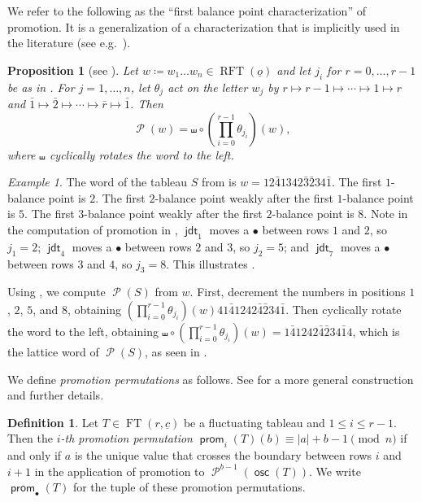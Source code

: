 \documentclass{amsart}
\newtheorem{proposition}[theorem]{Proposition}
\theoremstyle{definition}
\newtheorem{definition}[theorem]{Definition}
\theoremstyle{remark}
\newtheorem{example}[theorem]{Example}
\numberwithin{equation}{section}
\DeclareMathOperator{\osc}{\mathsf{osc}}
\DeclareMathOperator{\ft}{FT}
\DeclareMathOperator{\rft}{RFT}
\DeclareMathOperator{\prom}{\mathsf{prom}}
\DeclareMathOperator{\promotion}{\mathcal{P}}
\DeclareMathOperator{\JDT}{\mathsf{jdt}}
\begin{document}
We refer to the following as the ``first balance point characterization'' of promotion. It is a  generalization of a characterization that is implicitly used in the literature (see e.g.~\cite{Patrias,Petersen-Pylyavskyy-Rhoades,Tymoczko2012}).

\begin{proposition}[see {\cite[Prop.~8.22]{fluctuating-paper}}]
\label{prop:promotion-from-balance-points}
Let $w \coloneqq w_1 \ldots w_{n} \in \rft(\underline{o})$ and let $j_i$ for $r=0,\ldots, r-1$ be as in . For $j=1,\ldots,n$, let $\theta_j$ act on the letter $w_j$ by $r \mapsto r-1 \mapsto \cdots \mapsto 1 \mapsto r$ and $\bar{1} \mapsto \bar{2} \mapsto \cdots \mapsto \bar{r} \mapsto \bar{1}$. Then
\[
\promotion(w)=\shuffle \circ \left(\prod_{i=0}^{r-1} \theta_{j_i} \right)(w),
\]
where $\shuffle$ cyclically rotates the word to the left.
\end{proposition}


\begin{example}
\label{ex:balance_point}
The word of the tableau $S$ from  is $w=12\bar{4}1342\bar{3}\bar{2}34\bar{1}$.
The first $1$-balance point is $2$. The first $2$-balance point weakly after the first $1$-balance point is $5$.  The first $3$-balance point weakly after the first $2$-balance point is $8$. Note in the computation of promotion in , $\JDT_1$ moves a $\bullet$ between rows $1$ and $2$, so $j_1=2$; $\JDT_4$ moves a $\bullet$ between rows $2$ and $3$, so $j_2=5$; and $\JDT_7$ moves a $\bullet$ between rows $3$ and $4$, so $j_3=8$. This illustrates . 

Using , we compute $\promotion(S)$ from $w$. First, decrement the numbers in positions $1$, $2$, $5$, and $8$, obtaining $\left(\prod_{i=0}^{r-1} \theta_{j_i} \right)(w)41\bar{4}1242\bar{4}\bar{2}34\bar{1}$. 
Then cyclically rotate the word to the left, obtaining $\shuffle\circ\left( \prod_{i=0}^{r-1} \theta_{j_i} \right)(w)=1\bar{4}1242\bar{4}\bar{2}34\bar{1}4$, which is the lattice word of $\promotion(S)$, as seen in .
\end{example}

We define \emph{promotion permutations} as follows. See \cite[$\mathsection 6$]{fluctuating-paper} for a more general construction and further details.

\begin{definition}\label{def:prom-perms}
    Let $T \in \ft(r,\underline{c})$ be a fluctuating tableau and $1\leq i\leq r-1$. Then the \emph{$i$-th promotion permutation} $\prom_i(T)(b) \equiv |a|+b-1 \pmod n$ if and only if $a$ is the unique value that crosses the boundary between rows $i$ and $i+1$ in the application of promotion to  $\promotion^{b-1}(\osc(T))$.
    We write $\prom_{\bullet}(T)$ for the tuple of these promotion permutations.
\end{definition}
\end{document}

